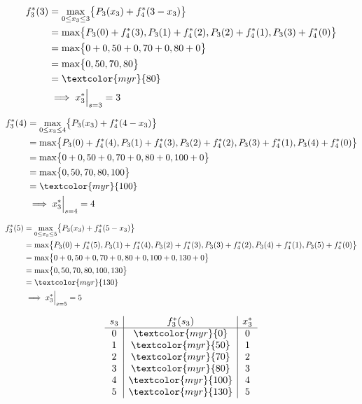 \documentclass{report}
\begin{document}
\begin{flushleft}
\begin{align*}
    f_3^{*}(3) &= \max_{0 \leq x_3 \leq 3} \bigl\{ P_3(x_3) + f_4^{*}(3 - x_3) \bigr\} \\
               &= \max \bigl\{ P_3(0) + f_4^{*}(3), P_3(1) + f_4^{*}(2), P_3(2) + f_4^{*}(1), P_3(3) + f_4^{*}(0) \bigr\} \\
               &= \max \bigl\{ 0 + 0, 50 + 0, 70 + 0, 80 + 0 \bigr\} \\
               &= \max \bigl\{ 0, 50, 70, 80 \bigr\} \\
               &= \textcolor{myr}{80} \\
               &\implies x_3^{*}\Big|_{s = 3} = 3
\end{align*}

\begin{align*}
    f_3^{*}(4) &= \max_{0 \leq x_3 \leq 4} \bigl\{ P_3(x_3) + f_4^{*}(4 - x_3) \bigr\} \\
               &= \max \bigl\{ P_3(0) + f_4^{*}(4), P_3(1) + f_4^{*}(3), P_3(2) + f_4^{*}(2), P_3(3) + f_4^{*}(1), P_3(4) + f_4^{*}(0) \bigr\} \\
               &= \max \bigl\{ 0 + 0, 50 + 0, 70 + 0, 80 + 0, 100 + 0 \bigr\} \\
               &= \max \bigl\{ 0, 50, 70, 80, 100 \bigr\} \\
               &= \textcolor{myr}{100} \\
               &\implies x_3^{*}\Big|_{s = 4} = 4
\end{align*}

\begin{align*}
    f_3^{*}(5) &= \max_{0 \leq x_3 \leq 5} \bigl\{ P_3(x_3) + f_4^{*}(5 - x_3) \bigr\} \\
               &= \max \bigl\{ P_3(0) + f_4^{*}(5), P_3(1) + f_4^{*}(4), P_3(2) + f_4^{*}(3), P_3(3) + f_4^{*}(2), P_3(4) + f_4^{*}(1), P_3(5) + f_4^{*}(0) \bigr\} \\
               &= \max \bigl\{ 0 + 0, 50 + 0, 70 + 0, 80 + 0, 100 + 0, 130 + 0 \bigr\} \\
               &= \max \bigl\{ 0, 50, 70, 80, 100, 130 \bigr\} \\
               &= \textcolor{myr}{130} \\
               &\implies x_3^{*}\Big|_{s = 5} = 5
\end{align*}
\end{flushleft}


\[
\begin{array}{c|c|c}
s_3 & f_3^{*}(s_3) & x_3^{*} \\ \hline
0 & \textcolor{myr}{0} & 0 \\ 
1 & \textcolor{myr}{50} & 1 \\ 
2 & \textcolor{myr}{70} & 2 \\ 
3 & \textcolor{myr}{80} & 3 \\ 
4 & \textcolor{myr}{100} & 4 \\ 
5 & \textcolor{myr}{130} & 5 \\ 
\end{array}
\]
\end{document}
